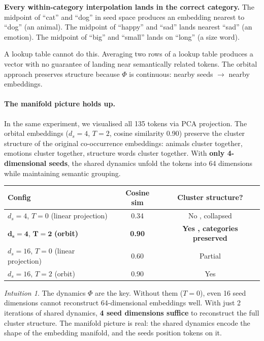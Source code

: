 \documentclass[11pt, a4paper]{article}
\theoremstyle{remark}
\newtheorem*{intuition}{Intuition}
\begin{document}
\noindent
\textbf{Every within-category interpolation lands in the correct category.}
The midpoint of ``cat'' and ``dog'' in seed space produces an embedding nearest to ``dog'' (an animal).
The midpoint of ``happy'' and ``sad'' lands nearest ``sad'' (an emotion).
The midpoint of ``big'' and ``small'' lands on ``long'' (a size word).

A lookup table cannot do this.
Averaging two rows of a lookup table produces a vector with no guarantee of landing near semantically related tokens.
The orbital approach preserves structure because $\Phi$ is continuous: nearby seeds $\to$ nearby embeddings.

\paragraph{The manifold picture holds up.}
In the same experiment, we visualised all 135 tokens via PCA projection.
The orbital embeddings ($d_s = 4$, $T = 2$, cosine similarity 0.90) preserve the cluster structure of the original co-occurrence embeddings: animals cluster together, emotions cluster together, structure words cluster together.
With \textbf{only 4-dimensional seeds}, the shared dynamics unfold the tokens into 64 dimensions while maintaining semantic grouping.

\begin{center}\small
\renewcommand{\arraystretch}{1.2}
\begin{tabular}{@{}lcc@{}}
\toprule
\textbf{Config} & \textbf{Cosine sim} & \textbf{Cluster structure?} \\
\midrule
$d_s = 4$, $T = 0$ (linear projection) & 0.34 & No ,  collapsed \\
$\mathbf{d_s = 4}$, $\mathbf{T = 2}$ \textbf{(orbit)} & \textbf{0.90} & \textbf{Yes ,  categories preserved} \\
$d_s = 16$, $T = 0$ (linear projection) & 0.60 & Partial \\
$d_s = 16$, $T = 2$ (orbit) & 0.90 & Yes \\
\bottomrule
\end{tabular}
\end{center}

\begin{intuition}
The dynamics $\Phi$ are the key.
Without them ($T = 0$), even 16 seed dimensions cannot reconstruct 64-dimensional embeddings well.
With just 2 iterations of shared dynamics, \textbf{4 seed dimensions suffice} to reconstruct the full cluster structure.
The manifold picture is real: the shared dynamics encode the shape of the embedding manifold, and the seeds position tokens on it.
\end{intuition}
\end{document}
